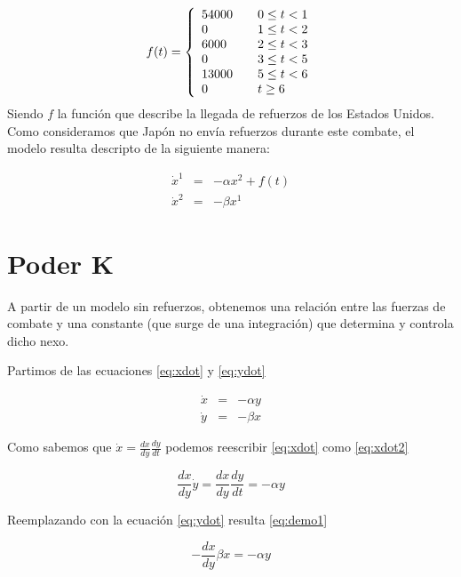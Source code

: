 \documentclass{sig-alternate}
\begin{document}
\begin{equation}
f(t) = \left\{ 
    \begin{array}{l l}
    54000 & \quad 0 \leq t < 1 \\
    0 & \quad 1 \leq t < 2\\
    6000 & \quad 2 \leq t < 3\\
    0 & \quad 3 \leq t < 5\\
    13000 & \quad 5 \leq t < 6\\
    0 & \quad t \geq 6\\
    \end{array} \right.
\end{equation}
Siendo $f$ la función que describe la llegada de refuerzos de los Estados Unidos. Como consideramos que Japón no envía refuerzos durante este
combate, el modelo resulta descripto de la siguiente manera:


\begin{eqnarray}
\dot{x}^1 &=& -\alpha x^2 + f(t)                              \\
\dot{x}^2 &=& -\beta x^1
\end{eqnarray}


\section{Poder K}
\label{sec:kirchner}
A partir de un modelo sin refuerzos, obtenemos
una relación entre las fuerzas de combate y una constante (que surge de una integración) que determina y controla dicho nexo.

Partimos de las ecuaciones \eqref{eq:xdot} y \eqref{eq:ydot}

\begin{eqnarray}
\dot{x} & = & -\alpha y\label{eq:xdot}\\
\dot{y} & = & -\beta x\label{eq:ydot}
\end{eqnarray}

Como sabemos que $\dot{x}=\frac{dx}{dy}\frac{dy}{dt}$ podemos reescribir \eqref{eq:xdot} como \eqref{eq:xdot2}

\begin{equation}
\frac{dx}{dy}\dot{y}=\frac{dx}{dy}\frac{dy}{dt}=-\alpha y
\label{eq:xdot2}
\end{equation}

Reemplazando con la ecuación \eqref{eq:ydot} resulta \eqref{eq:demo1}

\begin{equation}
-\frac{dx}{dy}\beta x=-\alpha y
\label{eq:demo1}
\end{equation}
\end{document}
